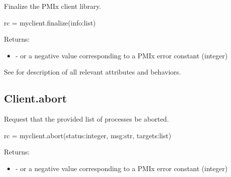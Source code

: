\summary

Finalize the PMIx client library.

\format

\pyspecificstart
\begin{codepar}
rc = myclient.finalize(info:list)
\end{codepar}
\pyspecificend

\begin{arglist}
\end{arglist}

Returns:

\begin{itemize}
    \item {} -  or a negative value corresponding to a PMIx error constant (integer)
\end{itemize}

See  for description of all relevant attributes and behaviors.


\subsection{Client.abort}

\summary

Request that the provided list of processes be aborted.

\format

\pyspecificstart
\begin{codepar}
rc = myclient.abort(status:integer, msg:str, targets:list)
\end{codepar}
\pyspecificend

\begin{arglist}
\end{arglist}

Returns:

\begin{itemize}
    \item {} -  or a negative value corresponding to a PMIx error constant (integer)
\end{itemize}

